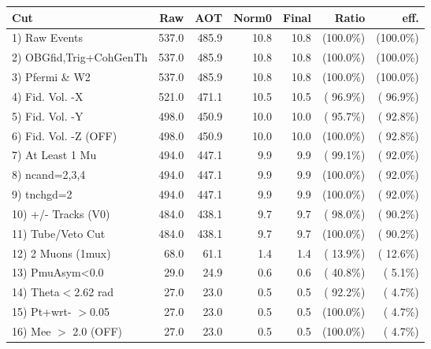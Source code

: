  \begin{table}[h!]\centering
 \begin{tabular}{||l||r|r|r|r|r|r||}
 \hline
 \hline
 Cut & Raw & AOT & Norm0 & Final & Ratio & eff.       \\
 \hline
  1) Raw Events           &        537.0 &        485.9 &         10.8 &         10.8 & (100.0\%) & (100.0\%) \\
  2) OBGfid,Trig+CohGenTh &        537.0 &        485.9 &         10.8 &         10.8 & (100.0\%) & (100.0\%) \\
  3) Pfermi \& W2         &        537.0 &        485.9 &         10.8 &         10.8 & (100.0\%) & (100.0\%) \\
  4) Fid. Vol. -X         &        521.0 &        471.1 &         10.5 &         10.5 & ( 96.9\%) & ( 96.9\%) \\
  5) Fid. Vol. -Y         &        498.0 &        450.9 &         10.0 &         10.0 & ( 95.7\%) & ( 92.8\%) \\
  6) Fid. Vol. -Z (OFF)   &        498.0 &        450.9 &         10.0 &         10.0 & (100.0\%) & ( 92.8\%) \\
  7) At Least 1 Mu        &        494.0 &        447.1 &          9.9 &          9.9 & ( 99.1\%) & ( 92.0\%) \\
  8) ncand=2,3,4          &        494.0 &        447.1 &          9.9 &          9.9 & (100.0\%) & ( 92.0\%) \\
  9) tnchgd=2             &        494.0 &        447.1 &          9.9 &          9.9 & (100.0\%) & ( 92.0\%) \\
 10) +/- Tracks (V0)      &        484.0 &        438.1 &          9.7 &          9.7 & ( 98.0\%) & ( 90.2\%) \\
 11) Tube/Veto Cut        &        484.0 &        438.1 &          9.7 &          9.7 & (100.0\%) & ( 90.2\%) \\
 12) 2 Muons (1mux)       &         68.0 &         61.1 &          1.4 &          1.4 & ( 13.9\%) & ( 12.6\%) \\
 13) PmuAsym<0.0          &         29.0 &         24.9 &          0.6 &          0.6 & ( 40.8\%) & (  5.1\%) \\
 14) Theta$<$2.62 rad     &         27.0 &         23.0 &          0.5 &          0.5 & ( 92.2\%) & (  4.7\%) \\
 15) Pt+wrt- $>$0.05      &         27.0 &         23.0 &          0.5 &          0.5 & (100.0\%) & (  4.7\%) \\
 16) Mee $>$ 2.0  (OFF)   &         27.0 &         23.0 &          0.5 &          0.5 & (100.0\%) & (  4.7\%) \\

\end{tabular}
\end{table}
